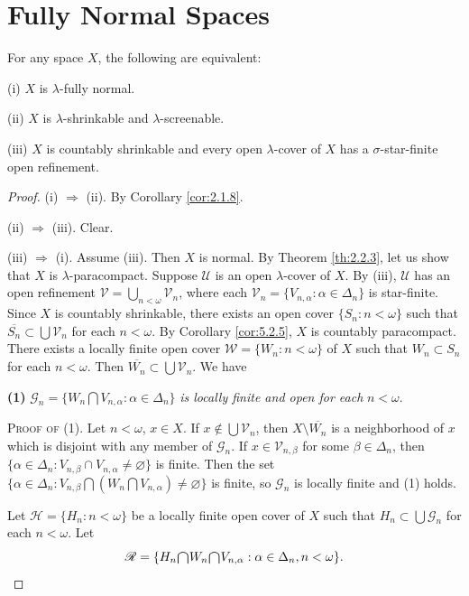\documentclass[jiang8iv.tex]{subfiles}
\begin{document}
\section{Fully Normal Spaces} \label{sec:8.2}


{\theorem{\label{th:8.2.1}}
For any space $X$, the following are equivalent:

\textup{(i)} $X$ is  $\lambda$-fully normal.

\textup{(ii)} $X$ is $\lambda$-shrinkable and $\lambda$-screenable.

\textup{(iii)} $X$ is countably shrinkable and every open $\lambda$-cover of $X$ has a $\sigma$-star-finite open refinement.
}

\begin{proof}
(i)  $\Rightarrow$  (ii). By Corollary \ref{cor:2.1.8}.

(ii) $\Rightarrow$ (iii). Clear. 

(iii) $\Rightarrow$ (i). Assume (iii). Then $X$ is normal. 
By Theorem \ref{th:2.2.3}, let us show that $X$ is $\lambda$-paracompact. 
Suppose $\mathscr{U}$ is an open $\lambda$-cover of $X$. By (iii), 
$\mathscr{U}$ has an open refinement 
$\mathscr{V} = \bigcup_{n < \omega} \mathscr{V}_n$, 
where each $\mathscr{V}_n = \{V_{n,\alpha}: \alpha \in \Delta_n\}$ 
is star-finite.
Since $X$ is countably shrinkable, there exists an
open cover $\{S_n: n<\omega\}$ such that 
$\overline{S_n}\subset\bigcup\mathscr{V}_n$
for each \(n < \omega\).
By Corollary \ref{cor:5.2.5}, 
\(X\) is countably paracompact. There exists
a locally finite open cover \(\mathscr{W}=\{W_n: n<\omega\}\) of \(X\) such that 
\(W_n\subset S_n\)
for each \(n<\omega\). Then \(\overline{W_n}\subset\bigcup\mathscr{V}_n\). 
We have

\textbf{(1)} \(\mathscr{G}_n=\{W_n\bigcap V_{n,\alpha}: \alpha\in\Delta_n\}\)
 \textit{is locally finite and open for each } \(n < \omega\).

\noindent\textsc{Proof of (1)}.
Let \(n<\omega\), \(x\in X\). If \(x\notin\bigcup{\mathscr{V}}_n\), 
then \(X\setminus\overline{W_n}\) is a
neighborhood of \(x\) which 
is disjoint with any member
of \(\mathscr{G}_n\). If \(x\in\mathscr{V}_{n,\beta}\) for some \(\beta\in\Delta_n\),
then \(\{\alpha\in\Delta_n: V_{n,\beta}\cap V_{n,\alpha}\neq\varnothing\}\) is finite. Then the set
\(\{\alpha\in\Delta_n: V_{n,\beta}\bigcap (W_n\bigcap V_{n,\alpha})\neq\varnothing\}\) is finite, 
so \(\mathscr{G}_n\) is locally finite and (1) holds.

Let \(\mathscr{H}=\{H_n: n<\omega\}\) be a locally finite open cover of \(X\) such that
\(H_n\subset\bigcup \mathscr{G}_n\) for each \(n<\omega\). 
Let
$$\mathscr{R}=\{H_n\raisebox{-2pt}{\scalebox{1.5}{$\cap$}} W_n
\raisebox{-2pt}{\scalebox{1.5}{$\cap$}} V_{n,\alpha}: \alpha\in\Delta_n, n < \omega\}.$$


\end{proof}
\end{document}
